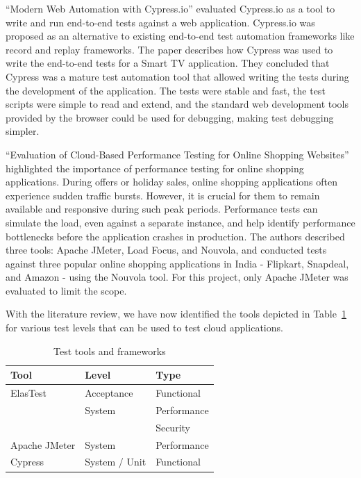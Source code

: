 \documentclass[conference]{IEEEtran}
\begin{document}
\enquote{Modern Web Automation with Cypress.io} evaluated Cypress.io\cite{cypress-website} as a tool to write and run end-to-end tests
against a web application\cite{jyolsna2022modern}.
Cypress.io was proposed as an alternative to existing end-to-end test automation frameworks like record and replay
frameworks\cite{jyolsna2022modern}.
The paper describes how Cypress was used to write the end-to-end tests for a Smart TV application.
They concluded that Cypress was a mature test automation tool that allowed writing the tests during
the development of the application\cite{jyolsna2022modern}.
The tests were stable and fast, the test scripts were simple to read and extend, and the standard web development tools
provided by the browser could be used for debugging, making test debugging simpler\cite{jyolsna2022modern}.

\enquote{Evaluation of Cloud-Based Performance Testing for Online Shopping Websites} highlighted the importance of
performance testing for online shopping applications.
During offers or holiday sales, online shopping applications often experience sudden traffic bursts.
However, it is crucial for them to remain available and responsive during such peak periods.
Performance tests can simulate the load, even against a separate instance, and help identify performance bottlenecks
before the application crashes in production.
The authors described three tools: Apache JMeter, Load Focus, and Nouvola, and conducted tests against three popular online
shopping applications in India - Flipkart, Snapdeal, and Amazon - using the Nouvola tool.
For this project, only Apache JMeter was evaluated to limit the scope.

With the literature review, we have now identified the tools depicted in Table~\ref{tab:test-tools-and-frameworks}
for various test levels that can be used to test cloud applications.

\begin{table}[h]
	\centering
	\begin{tabular}{| l | l | l |}
		\toprule
		\textbf{Tool}                            & \textbf{Level} & \textbf{Type} \\
		\midrule
		ElasTest\cite{bertolino2019systematic}   & Acceptance     & Functional    \\
		                                         & System         & Performance   \\
		                                         &                & Security      \\
		\midrule
		Apache JMeter\cite{janani2015evaluation} & System         & Performance   \\
		\midrule
		Cypress\cite{mobaraya2019technical}      & System / Unit  & Functional    \\
		\midrule
	\end{tabular}
	\caption{Test tools and frameworks}
	\label{tab:test-tools-and-frameworks}
\end{table}
\end{document}
